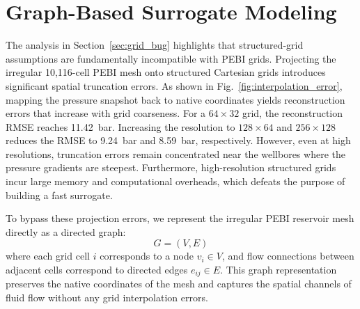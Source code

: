 \documentclass[10pt,twocolumn]{article}
\begin{document}
\section{Graph-Based Surrogate Modeling}
\label{sec:graph}
The analysis in Section~\ref{sec:grid_bug} highlights that structured-grid assumptions are fundamentally incompatible with PEBI grids. Projecting the irregular 10,116-cell PEBI mesh onto structured Cartesian grids introduces significant spatial truncation errors. As shown in Fig.~\ref{fig:interpolation_error}, mapping the pressure snapshot back to native coordinates yields reconstruction errors that increase with grid coarseness. For a $64 \times 32$ grid, the reconstruction RMSE reaches 11.42~bar. Increasing the resolution to $128 \times 64$ and $256 \times 128$ reduces the RMSE to 9.24~bar and 8.59~bar, respectively. However, even at high resolutions, truncation errors remain concentrated near the wellbores where the pressure gradients are steepest. Furthermore, high-resolution structured grids incur large memory and computational overheads, which defeats the purpose of building a fast surrogate.

To bypass these projection errors, we represent the irregular PEBI reservoir mesh directly as a directed graph:
\begin{equation}
\label{eq:graph_def}
G = (V, E)
\end{equation}
where each grid cell $i$ corresponds to a node $v_i \in V$, and flow connections between adjacent cells correspond to directed edges $e_{ij} \in E$. This graph representation preserves the native coordinates of the mesh and captures the spatial channels of fluid flow without any grid interpolation errors.
\end{document}
